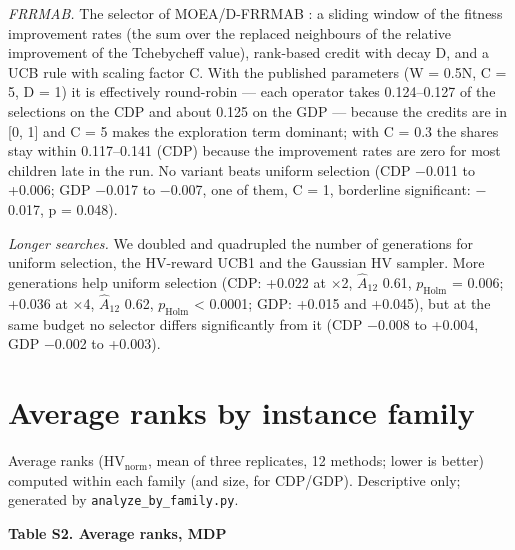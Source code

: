 \documentclass[final,3p,times,11pt,authoryear]{elsarticle}
\begin{document}
\emph{FRRMAB.} The selector of MOEA/D-FRRMAB \citep{li2014}: a sliding window of the fitness improvement rates (the sum over the replaced neighbours of the relative improvement of the Tchebycheff value), rank-based credit with decay D, and a UCB rule with scaling factor C. With the published parameters (W = 0.5N, C = 5, D = 1) it is effectively round-robin --- each operator takes 0.124--0.127 of the selections on the CDP and about 0.125 on the GDP --- because the credits are in [0, 1] and C = 5 makes the exploration term dominant; with C = 0.3 the shares stay within 0.117--0.141 (CDP) because the improvement rates are zero for most children late in the run. No variant beats uniform selection (CDP $-$0.011 to +0.006; GDP $-$0.017 to $-$0.007, one of them, C = 1, borderline significant: $-$0.017, p = 0.048).

\emph{Longer searches.} We doubled and quadrupled the number of generations for uniform selection, the HV-reward UCB1 and the Gaussian HV sampler. More generations help uniform selection (CDP: +0.022 at $\times$2, $\hat{A}_{12}$ 0.61, $p_{\mathrm{Holm}}$ = 0.006; +0.036 at $\times$4, $\hat{A}_{12}$ 0.62, $p_{\mathrm{Holm}}$ < 0.0001; GDP: +0.015 and +0.045), but at the same budget no selector differs significantly from it (CDP $-$0.008 to +0.004, GDP $-$0.002 to +0.003).

\section{Average ranks by instance family}

Average ranks ($\mathrm{HV}_{\mathrm{norm}}$, mean of three replicates, 12 methods; lower is better) computed within each family (and size, for CDP/GDP). Descriptive only; generated by \texttt{analyze\_\allowbreak{}by\_\allowbreak{}family.py}.

\textbf{Table S2. Average ranks, MDP}
\end{document}

